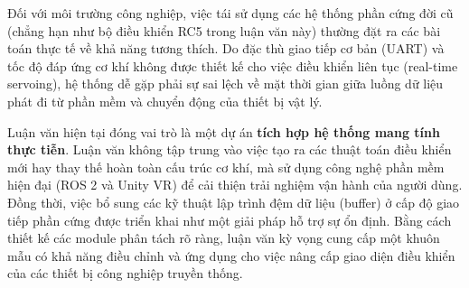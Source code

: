 Đối với môi trường công nghiệp, việc tái sử dụng các hệ thống phần cứng đời cũ (chẳng hạn như bộ điều khiển RC5 trong luận văn này) thường đặt ra các bài toán thực tế về khả năng tương thích. Do đặc thù giao tiếp cơ bản (UART) và tốc độ đáp ứng cơ khí không được thiết kế cho việc điều khiển liên tục (real-time servoing), hệ thống dễ gặp phải sự sai lệch về mặt thời gian giữa luồng dữ liệu phát đi từ phần mềm và chuyển động của thiết bị vật lý. 

Luận văn hiện tại đóng vai trò là một dự án \textbf{tích hợp hệ thống mang tính thực tiễn}. Luận văn không tập trung vào việc tạo ra các thuật toán điều khiển mới hay thay thế hoàn toàn cấu trúc cơ khí, mà sử dụng công nghệ phần mềm hiện đại (ROS 2 và Unity VR) để cải thiện trải nghiệm vận hành của người dùng. Đồng thời, việc bổ sung các kỹ thuật lập trình đệm dữ liệu (buffer) ở cấp độ giao tiếp phần cứng được triển khai như một giải pháp hỗ trợ sự ổn định. Bằng cách thiết kế các module phân tách rõ ràng, luận văn kỳ vọng cung cấp một khuôn mẫu có khả năng điều chỉnh và ứng dụng cho việc nâng cấp giao diện điều khiển của các thiết bị công nghiệp truyền thống.
